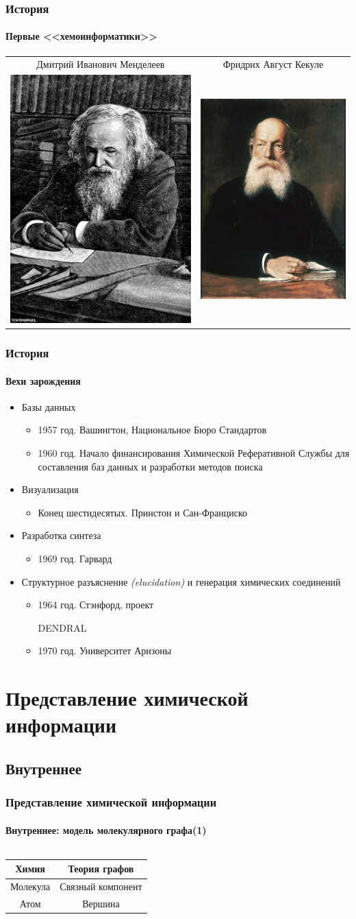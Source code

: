 \begin{frame}
   \frametitle{История}
   \framesubtitle{Первые <<хемоинформатики>>}
   \begin{center}
   \begin{tabular}{c c}
     Дмитрий Иванович Менделеев & Фридрих Август Кекуле \\
     \includegraphics[scale=0.25]{images/mendeleev.png} & \includegraphics[scale=0.31]{images/kekule.png} \\
   \end{tabular}
 \end{center}
\end{frame}

\begin{frame}
  \frametitle{История}
  \framesubtitle{Вехи зарождения}
  \begin{itemize}
    \item Базы данных
      \begin{itemize}
        \item 1957 год. Вашингтон, Национальное Бюро Стандартов
        \item 1960 год. Начало финансирования Химической Реферативной Службы для составления баз данных и разработки методов поиска          
      \end{itemize}
    \item Визуализация
      \begin{itemize}
        \item Конец шестидесятых. Принстон и Сан-Франциско
      \end{itemize}
        \item Разработка синтеза
          \begin{itemize}
            \item 1969 год. Гарвард
          \end{itemize}
        \item Структурное разъяснение \emph{(elucidation)} и генерация химических соединений
          \begin{itemize}
            \item 1964 год. Стэнфорд, проект \begin{tt}DENDRAL\end{tt}
            \item 1970 год. Университет Аризоны
          \end{itemize}
  \end{itemize}
\end{frame}

\section{Представление химической информации}
\subsection{Внутреннее}
\begin{frame}
  \frametitle{Представление химической информации}
  \framesubtitle{Внутреннее: модель молекулярного графа(1)}
   \begin{columns}
    \begin{column}{0.6\textwidth}
      \begin{tabular}{|c|c|}
      \hline Химия & Теория графов \\ \hline
      {\color{magenta}Молекула} & {\color{orange}Связный компонент} \\ \hline
      {\color{magenta}Атом} & {\color{orange}Вершина} \\ \hline
     
\end{tabular}
\end{column}
\end{columns}
\end{frame}
